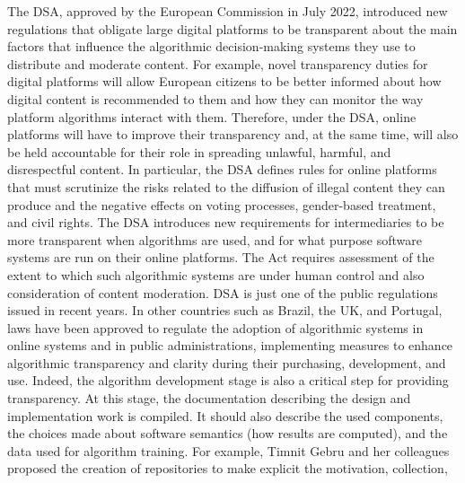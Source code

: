 {The DSA, approved by the European Commission in July 2022, introduced new regulations that obligate large digital platforms to be transparent about the main factors that influence the algorithmic decision-making systems they use to distribute and moderate content. For example, novel transparency duties for digital platforms will allow European citizens to be better informed about how digital content is recommended to them and how they can monitor the way platform algorithms interact with them. Therefore, under the DSA, online platforms will have to improve their transparency and, at the same time, will also be held accountable for their role in spreading unlawful, harmful, and disrespectful content. In particular, the DSA defines rules for online platforms that must scrutinize the risks related to the diffusion of illegal content they can produce and the negative effects on voting processes, gender-based treatment, and civil rights. The DSA introduces new requirements for intermediaries to be more transparent when algorithms are used, and for what purpose software systems are run on their online platforms. The Act requires assessment of the extent to which such algorithmic systems are under human control and also consideration of content moderation. DSA is just one of the public regulations issued in recent years. In other countries such as Brazil, the UK, and Portugal, laws have been approved to regulate the adoption of algorithmic systems in online systems and in public administrations, implementing measures to enhance algorithmic transparency and clarity during their purchasing, development, and use. Indeed, the algorithm development stage is also a critical step for providing transparency. At this stage, the documentation describing the design and implementation work is compiled. It should also describe the used components, the choices made about software semantics (how results are computed), and the data used for algorithm training. For example, Timnit Gebru and her colleagues proposed the creation of repositories\vadjust{\pagebreak} to make explicit the motivation, collection,\hfilneg}

